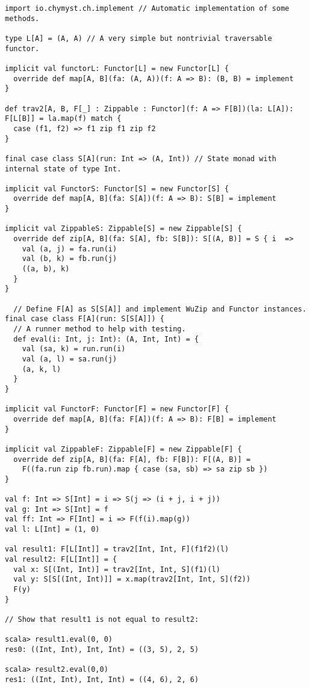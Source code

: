 \begin{lstlisting}[frame=single,fillcolor={\color{black}},framesep={0.2mm},framexleftmargin=2mm,framexrightmargin=2mm,framextopmargin=2mm,framexbottommargin=2mm]
import io.chymyst.ch.implement // Automatic implementation of some methods.

type L[A] = (A, A) // A very simple but nontrivial traversable functor.

implicit val functorL: Functor[L] = new Functor[L] {
  override def map[A, B](fa: (A, A))(f: A => B): (B, B) = implement
}

def trav2[A, B, F[_] : Zippable : Functor](f: A => F[B])(la: L[A]): F[L[B]] = la.map(f) match {
  case (f1, f2) => f1 zip f1 zip f2
}

final case class S[A](run: Int => (A, Int)) // State monad with internal state of type Int.

implicit val FunctorS: Functor[S] = new Functor[S] {
  override def map[A, B](fa: S[A])(f: A => B): S[B] = implement
}

implicit val ZippableS: Zippable[S] = new Zippable[S] {
  override def zip[A, B](fa: S[A], fb: S[B]): S[(A, B)] = S { i  =>
    val (a, j) = fa.run(i)
    val (b, k) = fb.run(j)
    ((a, b), k)
  }
}

  // Define F[A] as S[S[A]] and implement WuZip and Functor instances.
final case class F[A](run: S[S[A]]) {
  // A runner method to help with testing.
  def eval(i: Int, j: Int): (A, Int, Int) = {
    val (sa, k) = run.run(i)
    val (a, l) = sa.run(j)
    (a, k, l)
  }
}

implicit val FunctorF: Functor[F] = new Functor[F] {
  override def map[A, B](fa: F[A])(f: A => B): F[B] = implement
}

implicit val ZippableF: Zippable[F] = new Zippable[F] {
  override def zip[A, B](fa: F[A], fb: F[B]): F[(A, B)] =
    F((fa.run zip fb.run).map { case (sa, sb) => sa zip sb })
}

val f: Int => S[Int] = i => S(j => (i + j, i + j))
val g: Int => S[Int] = f
val ff: Int => F[Int] = i => F(f(i).map(g))
val l: L[Int] = (1, 0)

val result1: F[L[Int]] = trav2[Int, Int, F](f1f2)(l)
val result2: F[L[Int]] = {
  val x: S[(Int, Int)] = trav2[Int, Int, S](f1)(l)
  val y: S[S[(Int, Int)]] = x.map(trav2[Int, Int, S](f2))
  F(y)
}

// Show that result1 is not equal to result2:

scala> result1.eval(0, 0)
res0: ((Int, Int), Int, Int) = ((3, 5), 2, 5)

scala> result2.eval(0,0)
res1: ((Int, Int), Int, Int) = ((4, 6), 2, 6) 
\end{lstlisting}


